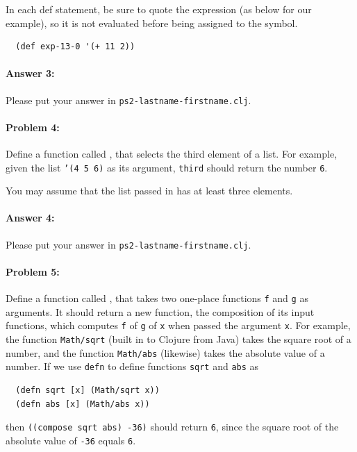 \documentclass[10pt]{article}
\newcommand{\required}[1]{{\color{blue}{#1}}}
\newcommand{\PSnum}{2}
\begin{document}
In each def statement, be sure to quote the expression (as below for our
example), so it is not evaluated before being assigned to the symbol.

\begin{lstlisting}
  (def exp-13-0 '(+ 11 2))
\end{lstlisting}

\paragraph{Answer 3:} Please put your answer in
\texttt{ps\PSnum-lastname-firstname.clj}.

\noindent\hrulefill %

\paragraph{Problem 4:}
Define a function called \required{\texttt{third}}, that selects the third
element of a list. For example, given the list \texttt{'(4 5 6)} as its
argument, \texttt{third} should return the number \texttt{6}.

You may assume that the list passed in has at least three elements.

\paragraph{Answer 4:} Please put your answer in
\texttt{ps\PSnum-lastname-firstname.clj}.

\noindent\hrulefill %

\paragraph{Problem 5:} Define a function called \required{\texttt{compose}},
that takes two one-place functions \texttt{f} and \texttt{g} as arguments. It
should return a new function, the composition of its input functions, which
computes \texttt{f} of \texttt{g} of \texttt{x} when passed the argument
\texttt{x}. For example, the function \texttt{Math/sqrt} (built in to Clojure
from Java) takes the square root of a number, and the function \texttt{Math/abs}
(likewise)  takes the absolute value of a number. If we use \texttt{defn} to
define functions \texttt{sqrt} and \texttt{abs} as
\begin{lstlisting}
  (defn sqrt [x] (Math/sqrt x))
  (defn abs [x] (Math/abs x))
\end{lstlisting}
then \texttt{((compose sqrt abs) -36)} should return \texttt{6}, since the
square root of the absolute value of \texttt{-36} equals \texttt{6}.
\end{document}
